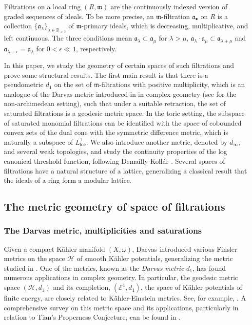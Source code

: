 \documentclass[11pt, leqno]{amsart}%
\theoremstyle{plain}
\theoremstyle{definition}
\theoremstyle{remark}
\newcommand{\cE}{\mathcal{E}}
\newcommand{\cH}{\mathcal{H}}
\newcommand{\bR}{\mathbb{R}}
\newcommand{\fa}{\mathfrak{a}}
\newcommand{\fm}{\mathfrak{m}}
\newcommand{\loc}{\mathrm{loc}}
\numberwithin{equation}{section}
\begin{document}
    Filtrations on a local ring $(R,\fm)$ are the continuously indexed version of graded sequences of ideals. To be more precise, an $\fm$-filtration $\fa_\bullet$ on $R$ is a collection $\{\fa_\lambda\}_{\lambda\in\bR_{>0}}$ of $\fm$-primary ideals, which is decreasing, multiplicative, and left continuous. The three conditions mean $\fa_\lambda\subset\fa_\mu$ for $\lambda>\mu$, $\fa_\lambda\cdot\fa_\mu\subset\fa_{\lambda+\mu}$ and $\fa_{\lambda-\epsilon}=\fa_\lambda$ for $0<\epsilon\ll 1$, respectively. 
    
    In this paper, we study the geometry of certain spaces of such filtrations and prove some structural results. The first main result is that there is a pseudometric $d_1$ on the set of $\fm$-filtrations with positive multiplicity, which is an analogue of the Darvas metric introduced in \cite{Dar15} in complex geometry (see \cite{BJ21} for the non-archimedean setting), such that under a suitable retraction, the set of saturated filtrations is a geodesic metric space. In the toric setting, the subspace of saturated monomial filtrations can be identified with the space of cobounded convex sets of the dual cone with the symmetric difference metric, which is naturally a subspace of $L^1_\loc$. 
    We also introduce another metric, denoted by $d_\infty$, and several weak topologies, and study the continuity properties of the log canonical threshold function, following Demailly-Koll\'ar \cite{DK01}. 
    Several spaces of filtrations have a natural structure of a lattice, generalizing a classical result that the ideals of a ring form a modular lattice.

\subsection{The metric geometry of space of filtrations}\label{ssec:metric geometry}
	
\subsubsection{The Darvas metric, multiplicities and saturations}\label{sssec:d_1 intro}
	
Given a compact K\"ahler manifold $(X,\omega)$, Darvas \cite{Dar15} introduced various Finsler metrics on the space $\cH$ of smooth K\"ahler potentials, generalizing the metric studied in \cite{Mab87}. One of the metrics, known as the \emph{Darvas metric} $d_1$, has found numerous applications in complex geometry. In particular, the geodesic metric space $(\cH,d_1)$ and its completion, $(\cE^1,d_1)$, the space of K\"ahler potentials of finite energy, are closely related to K\"ahler-Einstein metrics. See, for example, \cites{DR17,BBEGZ19,DL20}. A comprehensive survey on this metric space and its applications, particularly in relation to Tian’s Properness Conjecture, can be found in \cite{Dar19}.
	
\end{document}
